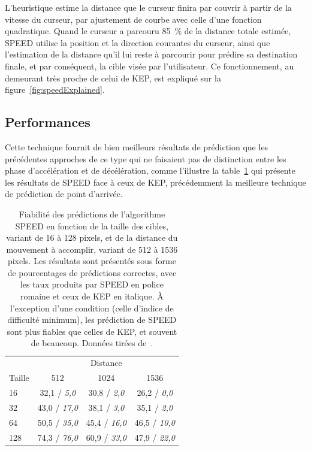 	L'heuristique estime la distance que le curseur finira par couvrir à partir de la vitesse du curseur, par ajustement de courbe avec celle d'une fonction quadratique. Quand le curseur a parcouru 85~\%{} de la distance totale estimée, SPEED utilise la position et la direction courantes du curseur, ainsi que l'estimation de la distance qu'il lui reste à parcourir pour prédire sa destination finale, et par conséquent, la cible visée par l'utilisateur. Ce fonctionnement, au demeurant très proche de celui de KEP, est expliqué sur la figure~\ref{fig:speedExplained}.
	
	\subsection{Performances}	
	Cette technique fournit de bien meilleurs résultats de prédiction que les précédentes approches de ce type qui ne faisaient pas de distinction entre les phase d'accélération et de décélération, comme l'illustre la table~\ref{tab:speedingPastKep} qui présente les résultats de SPEED face à ceux de KEP, précédemment la meilleure technique de prédiction de point d'arrivée.
	
	\begin{table}
	\centering
	\begin{tabular}{l | c c c}
				& \multicolumn{3}{c}{Distance}	\\
		Taille	& 512					& 1024					& 1536					\bigstrut[b] \\ \hline
		16		& 32,1 / \emph{5,0}		& 30,8 / \emph{2,0}		& 26,2 / \emph{0,0}		\bigstrut[t] \\
		32		& 43,0 / \emph{17,0}	& 38,1 / \emph{3,0}		& 35,1 / \emph{2,0}		\\
		64		& 50,5 / \emph{35,0}	& 45,4 / \emph{16,0}	& 46,5 / \emph{10,0}	\\
		128		& 74,3 / \emph{76,0}	& 60,9 / \emph{33,0}	& 47,9 / \emph{22,0}	\\
	\end{tabular}
	\caption[SPEED -- performances comparées à celles de KEP]{Fiabilité des prédictions de l'algorithme SPEED en fonction de la taille des cibles, variant de 16 à 128 pixels, et de la distance du mouvement à accomplir, variant de 512 à 1536 pixels. Les résultats sont présentés sous forme de pourcentages de prédictions correctes, avec les taux produits par SPEED en police romaine et ceux de KEP en italique. À l'exception d'une condition (celle d'indice de difficulté minimum), les prédiction de SPEED sont plus fiables que celles de KEP, et souvent de beaucoup. Données tirées de~\cite{wonner2011speed}.}
	\label{tab:speedingPastKep}
	\end{table}
	
